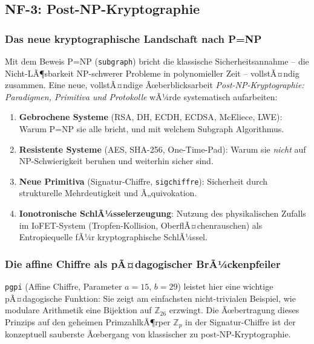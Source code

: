 ﻿\documentclass[a4paper,12pt]{scrreprt}
\theoremstyle{definition}
\begin{document}
\subsection{NF-3: Post-NP-Kryptographie}

\subsubsection{Das neue kryptographische Landschaft nach P=NP}

Mit dem Beweis P=NP (\texttt{subgraph}) bricht die klassische
Sicherheitsannahme -- die Nicht-LÃ¶sbarkeit NP-schwerer Probleme in
polynomieller Zeit -- vollstÃ¤ndig zusammen. Eine neue, vollstÃ¤ndige
Ãœberblicksarbeit \emph{Post-NP-Kryptographie: Paradigmen, Primitiva und
Protokolle} wÃ¼rde systematisch aufarbeiten:

\begin{enumerate}
  \item \textbf{Gebrochene Systeme} (RSA, DH, ECDH, ECDSA, McEliece,
    LWE): Warum P=NP sie alle bricht, und mit welchem Subgraph Algorithmus.
  \item \textbf{Resistente Systeme} (AES, SHA-256, One-Time-Pad):
    Warum sie \emph{nicht} auf NP-Schwierigkeit beruhen und weiterhin
    sicher sind.
  \item \textbf{Neue Primitiva} (Signatur-Chiffre, \texttt{sigchiffre}):
    Sicherheit durch strukturelle Mehrdeutigkeit und Ã„quivokation.
  \item \textbf{Ionotronische SchlÃ¼sselerzeugung}: Nutzung des
    physikalischen Zufalls im IoFET-System (Tropfen-Kollision,
    OberflÃ¤chenrauschen) als Entropiequelle fÃ¼r kryptographische SchlÃ¼ssel.
\end{enumerate}

\subsubsection{Die affine Chiffre als pÃ¤dagogischer BrÃ¼ckenpfeiler}

\texttt{pgpi} (Affine Chiffre, Parameter $a=15$, $b=29$) leistet hier
eine wichtige pÃ¤dagogische Funktion: Sie zeigt am einfachsten
nicht-trivialen Beispiel, wie modulare Arithmetik eine Bijektion auf
$\mathbb{Z}_{26}$ erzwingt. Die Ãœbertragung dieses Prinzips auf den
geheimen PrimzahlkÃ¶rper $\mathbb{Z}_p$ in der Signatur-Chiffre ist
der konzeptuell sauberste Ãœbergang von klassischer zu post-NP-Kryptographie.
\end{document}
